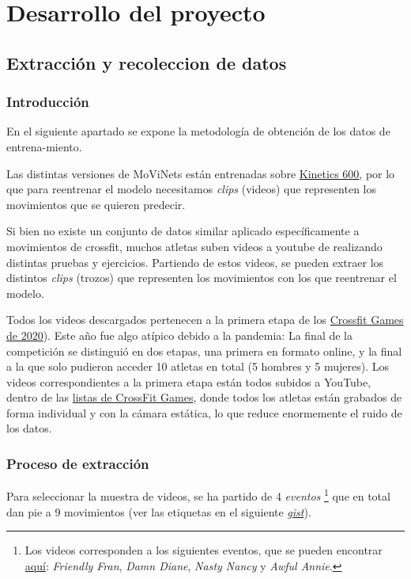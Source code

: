 \chapter{Desarrollo del proyecto}

\section{Extracción y recoleccion de datos}

\subsection{Introducción}

En el siguiente apartado se expone la metodología de obtención de los datos de entrena-miento.

Las distintas versiones de MoViNets están entrenadas sobre \href{https://www.deepmind.com/open-source/kinetics}{Kinetics 600}, por lo que para reentrenar el modelo necesitamos \textit{clips} (videos) que representen los movimientos que se quieren predecir.

Si bien no existe un conjunto de datos similar aplicado específicamente a movimientos de crossfit, muchos atletas suben videos a youtube de realizando distintas pruebas y ejercicios. Partiendo de estos videos, se pueden extraer los distintos \textit{clips} (trozos) que representen los movimientos con los que reentrenar el modelo.

Todos los videos descargados pertenecen a la primera etapa de los \href{https://en.wikipedia.org/wiki/2020_CrossFit_Games}{Crossfit Games de 2020}). Este año fue algo atípico debido a la pandemia: La final de la competición se distinguió en dos etapas, una primera en formato online, y la final a la que solo pudieron acceder 10 atletas en total (5 hombres y 5 mujeres). Los videos correspondientes a la primera etapa están todos subidos a YouTube, dentro de las \href{https://www.youtube.com/c/CrossFitGamesTV/playlists}{listas de CrossFit Games}, donde todos los atletas están grabados de forma individual y con la cámara estática, lo que reduce enormemente el ruido de los datos.


\subsection{Proceso de extracción}

Para seleccionar la muestra de videos, se ha partido de 4 \textit{eventos} \footnote{Los videos corresponden a los siguientes eventos, que se pueden encontrar \href{https://games.crossfit.com/workouts/games/2020}{aquí}: \textit{Friendly Fran}, \textit{Damn Diane}, \textit{Nasty Nancy} y \textit{Awful Annie}.} que en total dan pie a 9 movimientos (ver las etiquetas en el siguiente \href{https://gist.github.com/plaguss/58091caefee6acb39ae51cbc241b3cf9/raw/labels.txt}{\textit{gist}}).

